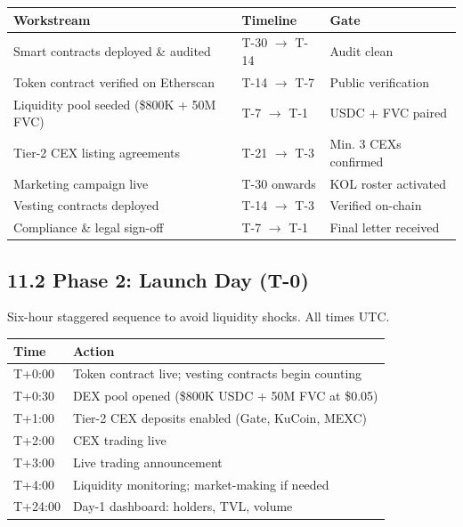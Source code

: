\documentclass[
  paper=a4,
  ,captions=tableheading
]{scrartcl}
\begin{document}
\begin{center}
\begin{tabular}{lll}
\toprule
\textbf{Workstream} & \textbf{Timeline} & \textbf{Gate} \\
\midrule
Smart contracts deployed \& audited & T-30 $\rightarrow$ T-14 & Audit clean \\
Token contract verified on Etherscan & T-14 $\rightarrow$ T-7 & Public verification \\
Liquidity pool seeded (\$800K + 50M FVC) & T-7 $\rightarrow$ T-1 & USDC + FVC paired \\
Tier-2 CEX listing agreements & T-21 $\rightarrow$ T-3 & Min. 3 CEXs confirmed \\
Marketing campaign live & T-30 onwards & KOL roster activated \\
Vesting contracts deployed & T-14 $\rightarrow$ T-3 & Verified on-chain \\
Compliance \& legal sign-off & T-7 $\rightarrow$ T-1 & Final letter received \\
\bottomrule
\end{tabular}
\end{center}

\subsection{11.2 Phase 2: Launch Day (T-0)}\label{tge-phase-2}

Six-hour staggered sequence to avoid liquidity shocks. All times UTC.

\begin{center}
\begin{tabular}{ll}
\toprule
\textbf{Time} & \textbf{Action} \\
\midrule
T+0:00 & Token contract live; vesting contracts begin counting \\
T+0:30 & DEX pool opened (\$800K USDC + 50M FVC at \$0.05) \\
T+1:00 & Tier-2 CEX deposits enabled (Gate, KuCoin, MEXC) \\
T+2:00 & CEX trading live \\
T+3:00 & Live trading announcement \\
T+4:00 & Liquidity monitoring; market-making if needed \\
T+24:00 & Day-1 dashboard: holders, TVL, volume \\
\bottomrule
\end{tabular}
\end{center}
\end{document}
